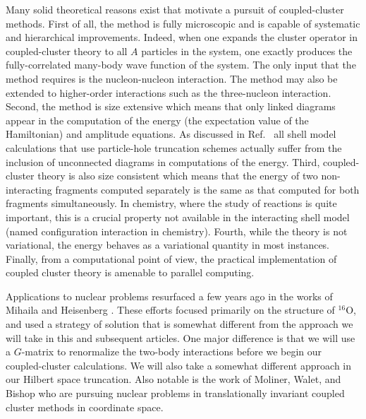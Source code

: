 Many solid theoretical reasons exist that motivate a pursuit of
coupled-cluster methods. First of all, the method is fully 
microscopic and is capable of systematic and hierarchical improvements.
Indeed, when one expands the cluster operator in coupled-cluster theory
to all $A$ particles in the system, one exactly produces the fully-correlated
many-body wave function of the system. The only input that the method
requires is the nucleon-nucleon interaction. 
The method may also be extended
to higher-order interactions such as the three-nucleon interaction. 
Second, the method is size extensive which means that only linked 
diagrams appear in the computation of the 
energy (the expectation value of the Hamiltonian) and amplitude equations. 
As discussed in Ref.~\cite{comp_chem_rev00} all shell model calculations 
that use particle-hole truncation schemes
actually suffer from the inclusion of unconnected diagrams 
in computations of the energy. 
Third, coupled-cluster theory is also size
consistent which means that the energy of two non-interacting fragments 
computed separately is the same as that computed for both fragments
simultaneously. In chemistry, where the study of reactions 
is quite important, this is a crucial property not available
in the interacting shell model (named configuration interaction in
chemistry).
Fourth, while the theory 
is not variational, 
the energy behaves as a variational quantity in most instances. 
Finally, from a 
computational point of view, the practical implementation of coupled 
cluster theory is amenable to parallel computing. 

Applications to nuclear problems resurfaced a few
years ago in the works of Mihaila and Heisenberg \cite{mh00a,mh00b,mh99,hm99}.
These efforts focused primarily on the structure of
$^{16}$O, and used a strategy of solution that is somewhat different
from the approach we will take in this and subsequent articles. One 
major difference is that we will use a $G$-matrix to renormalize the
two-body interactions before we begin our coupled-cluster calculations. 
We will also take a somewhat different approach in our Hilbert 
space truncation. Also notable is the work of Moliner, Walet, and Bishop
\cite{mwb02} who are pursuing nuclear problems in translationally 
invariant coupled cluster methods in coordinate space.

